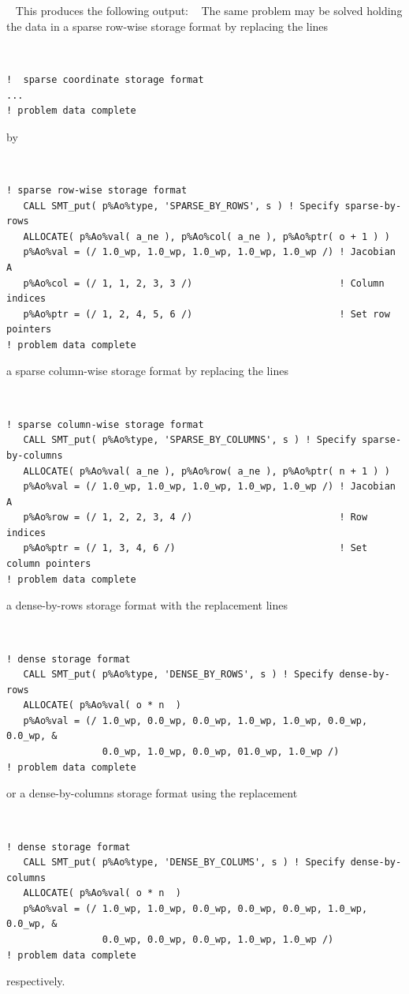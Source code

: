 \documentclass{galahad}
\begin{document}
{\tt \small
\VerbatimInput{\packageexample}
}
\noindent
This produces the following output: \vspace*{-2mm}
{\tt \small
\VerbatimInput{\packageresults}
}
\noindent
The same problem may be solved holding the data in
a sparse row-wise storage format by replacing the lines
{\tt \small
\begin{verbatim}
!  sparse coordinate storage format
...
! problem data complete
\end{verbatim}
}
\noindent
by
{\tt \small
\begin{verbatim}
! sparse row-wise storage format
   CALL SMT_put( p%Ao%type, 'SPARSE_BY_ROWS', s ) ! Specify sparse-by-rows
   ALLOCATE( p%Ao%val( a_ne ), p%Ao%col( a_ne ), p%Ao%ptr( o + 1 ) )
   p%Ao%val = (/ 1.0_wp, 1.0_wp, 1.0_wp, 1.0_wp, 1.0_wp /) ! Jacobian A
   p%Ao%col = (/ 1, 1, 2, 3, 3 /)                          ! Column indices
   p%Ao%ptr = (/ 1, 2, 4, 5, 6 /)                          ! Set row pointers
! problem data complete
\end{verbatim}
}
\noindent
a sparse column-wise storage format by replacing the lines
{\tt \small
\begin{verbatim}
! sparse column-wise storage format
   CALL SMT_put( p%Ao%type, 'SPARSE_BY_COLUMNS', s ) ! Specify sparse-by-columns
   ALLOCATE( p%Ao%val( a_ne ), p%Ao%row( a_ne ), p%Ao%ptr( n + 1 ) )
   p%Ao%val = (/ 1.0_wp, 1.0_wp, 1.0_wp, 1.0_wp, 1.0_wp /) ! Jacobian A
   p%Ao%row = (/ 1, 2, 2, 3, 4 /)                          ! Row indices
   p%Ao%ptr = (/ 1, 3, 4, 6 /)                             ! Set column pointers
! problem data complete
\end{verbatim}
}
\noindent
a dense-by-rows storage format with the replacement lines
{\tt \small
\begin{verbatim}
! dense storage format
   CALL SMT_put( p%Ao%type, 'DENSE_BY_ROWS', s ) ! Specify dense-by-rows
   ALLOCATE( p%Ao%val( o * n  )
   p%Ao%val = (/ 1.0_wp, 0.0_wp, 0.0_wp, 1.0_wp, 1.0_wp, 0.0_wp, 0.0_wp, &
                 0.0_wp, 1.0_wp, 0.0_wp, 01.0_wp, 1.0_wp /)
! problem data complete
\end{verbatim}
}
\noindent
or a dense-by-columns storage format using the replacement
{\tt \small
\begin{verbatim}
! dense storage format
   CALL SMT_put( p%Ao%type, 'DENSE_BY_COLUMS', s ) ! Specify dense-by-columns
   ALLOCATE( p%Ao%val( o * n  )
   p%Ao%val = (/ 1.0_wp, 1.0_wp, 0.0_wp, 0.0_wp, 0.0_wp, 1.0_wp, 0.0_wp, &
                 0.0_wp, 0.0_wp, 0.0_wp, 1.0_wp, 1.0_wp /)
! problem data complete
\end{verbatim}
}
\noindent
respectively.
\end{document}
